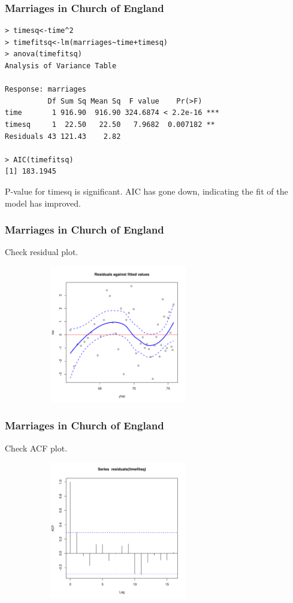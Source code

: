 \documentclass[%
xcolor=pdftex]{beamer}
\begin{document}
\begin{frame}[fragile]
\frametitle{Marriages in Church of England}

\begin{verbatim}
> timesq<-time^2
> timefitsq<-lm(marriages~time+timesq)
> anova(timefitsq)
Analysis of Variance Table

Response: marriages
          Df Sum Sq Mean Sq  F value    Pr(>F)
time       1 916.90  916.90 324.6874 < 2.2e-16 ***
timesq     1  22.50   22.50   7.9682  0.007182 **
Residuals 43 121.43    2.82

> AIC(timefitsq)
[1] 183.1945
\end{verbatim}

P-value for timesq is significant. AIC has gone down, indicating the fit of the model has improved.

\end{frame}

\begin{frame}
\frametitle{Marriages in Church of England}

Check residual plot.

\includegraphics[width=100mm, height=60mm]{pics/residtimefitsq.pdf}

\end{frame}

\begin{frame}
\frametitle{Marriages in Church of England}

Check ACF plot.

\includegraphics[width=100mm, height=60mm]{pics/acftimefitsq.pdf}

\end{frame}
\end{document}
